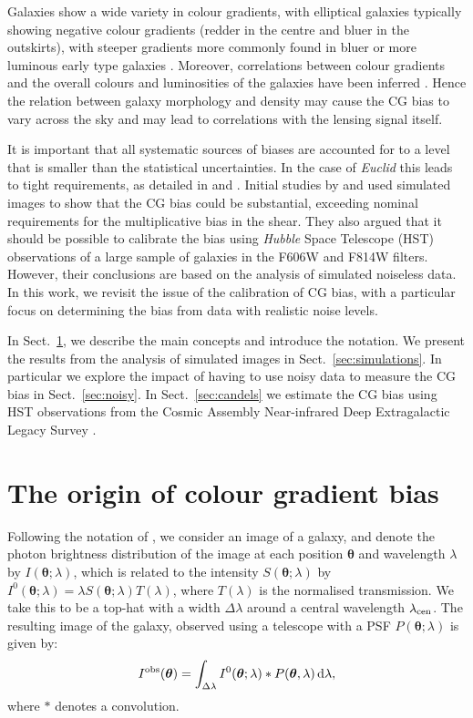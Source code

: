 \documentclass[useAMS,usenatbib]{mnras}
\renewcommand{\d}{\mathrm{d}}
\newcommand{\be}{\begin{equation}}
\newcommand{\ee}{\end{equation}}
\begin{document}
Galaxies show a wide variety in colour gradients, with elliptical galaxies typically showing negative colour gradients (redder in the centre and bluer in the outskirts), with steeper gradients more commonly found in bluer or more luminous early type galaxies \citep[e.g.][]{2011MNRAS.414.3052D,
2011MNRAS.411.1151G}. Moreover, correlations between colour gradients and the overall colours and luminosities of the galaxies have been inferred \citep[e.g.][]{2010AJ....140.1528L, 2016A&A...593A..84K}.
Hence the relation between galaxy morphology and density may cause the CG bias to vary across the sky and may lead to correlations with the lensing signal itself.

It is important that all systematic sources of biases are accounted for to a level that is smaller than the
statistical uncertainties. In the case of {\it Euclid} this leads to tight requirements, as detailed in
\cite{Massey13} and \cite{Cropper13}. Initial studies by \cite{Voigt12} and  used simulated images to show that the CG bias could be substantial,
exceeding nominal requirements for the multiplicative bias in the shear. They also argued
that it should be possible to calibrate the bias using {\it Hubble} Space Telescope (HST) observations
of a large sample of galaxies in the F606W and F814W filters. However, their conclusions are based on the analysis of simulated noiseless data. In this work, we revisit the issue of the calibration of CG bias,
with a particular focus on determining the bias from data with realistic noise levels.

In Sect.~\ref{sec:concepts}, we describe the main concepts and introduce the notation. We present the results from the analysis of simulated images in Sect.~\ref{sec:simulations}. In particular we explore the  impact of having to use noisy data to measure the CG bias in Sect.~\ref{sec:noisy}.
In Sect.~\ref{sec:candels} we estimate the CG bias using HST observations from the Cosmic Assembly Near-infrared Deep Extragalactic Legacy Survey \citep[CANDELS;][]{Koekemoer11}.

\section{The origin of colour gradient bias}
\label{sec:concepts}

Following the notation of , we consider an image of a galaxy, and denote the photon brightness
distribution of the image at each position $\bm \theta$ and wavelength $\lambda$ by $I({\bm \theta};\lambda)$, which is related to the intensity $S({\bm\theta};\lambda)$ by $I^0({\bm\theta};\lambda)=\lambda S({\bm\theta};\lambda)
T(\lambda)$, where $T(\lambda)$ is the normalised transmission. We take this to be a top-hat with a
width $\Delta\lambda$ around a central wavelength $\lambda_{\rm cen}$. The resulting image of the galaxy, observed using a telescope with a PSF $P({\bm \theta};\lambda)$  is given by:
%
\be
I^{\rm obs}({\bm\theta}) = \int_{\Delta\lambda} I^0({\bm\theta}; \lambda) *
P({\bm \theta},\lambda)\, \d \lambda,
\label{eq:iobs}
\ee
%
where $*$ denotes a convolution.
\end{document}
